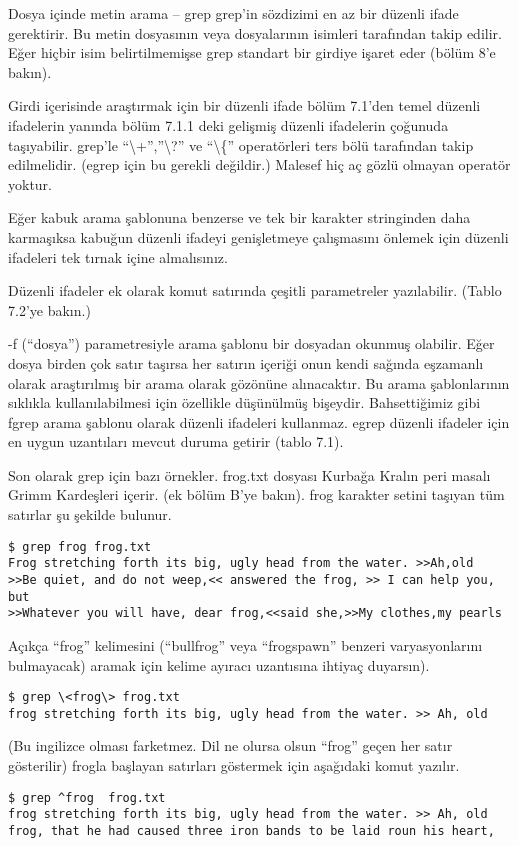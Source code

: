 \documentclass[10pt,a5paper]{book}
\begin{document}
\begin{section}{Dosya içinde metin arama – grep}
grep’in sözdizimi en az bir düzenli ifade gerektirir. Bu metin dosyasının veya dosyalarının isimleri tarafından takip edilir. Eğer hiçbir isim belirtilmemişse grep standart bir girdiye işaret eder (bölüm 8’e bakın).

Girdi içerisinde araştırmak için bir düzenli ifade bölüm 7.1’den temel düzenli ifadelerin yanında bölüm 7.1.1 deki gelişmiş düzenli ifadelerin çoğunuda taşıyabilir. grep’le “\textbackslash +”,”\textbackslash ?” ve “\textbackslash \{” operatörleri ters bölü tarafından takip edilmelidir. (egrep için bu gerekli değildir.) Malesef hiç aç gözlü olmayan operatör yoktur. 

Eğer kabuk arama şablonuna benzerse ve tek bir karakter stringinden daha karmaşıksa kabuğun düzenli ifadeyi genişletmeye çalışmasını önlemek için düzenli ifadeleri tek tırnak içine almalısınız.

Düzenli ifadeler ek olarak komut satırında çeşitli parametreler yazılabilir. (Tablo 7.2’ye bakın.)

-f (“dosya”) parametresiyle arama şablonu bir dosyadan okunmuş olabilir. Eğer dosya birden çok satır taşırsa her satırın içeriği onun kendi sağında eşzamanlı olarak araştırılmış bir arama olarak gözönüne alınacaktır. Bu arama şablonlarının sıklıkla kullanılabilmesi için özellikle düşünülmüş bişeydir. 
Bahsettiğimiz gibi fgrep arama şablonu olarak düzenli ifadeleri kullanmaz. egrep düzenli ifadeler için en uygun uzantıları mevcut duruma getirir (tablo 7.1).

Son olarak grep için bazı örnekler. frog.txt dosyası Kurbağa Kralın peri masalı Grimm Kardeşleri içerir. (ek bölüm B’ye bakın). frog karakter setini taşıyan tüm satırlar şu şekilde bulunur.
\begin{verbatim}
$ grep frog frog.txt
Frog stretching forth its big, ugly head from the water. >>Ah,old
>>Be quiet, and do not weep,<< answered the frog, >> I can help you, but
>>Whatever you will have, dear frog,<<said she,>>My clothes,my pearls
\end{verbatim}

Açıkça “frog” kelimesini (“bullfrog” veya “frogspawn” benzeri  varyasyonlarını bulmayacak) aramak için kelime ayıracı uzantısına ihtiyaç duyarsın).

\begin{verbatim}
$ grep \<frog\> frog.txt
frog stretching forth its big, ugly head from the water. >> Ah, old
\end{verbatim}

(Bu ingilizce olması farketmez. Dil ne olursa olsun “frog” geçen her satır gösterilir) frogla başlayan satırları göstermek için aşağıdaki komut yazılır.
\begin{verbatim}
$ grep ^frog  frog.txt
frog stretching forth its big, ugly head from the water. >> Ah, old
frog, that he had caused three iron bands to be laid roun his heart,
\end{verbatim}


\end{section}
\end{document}
